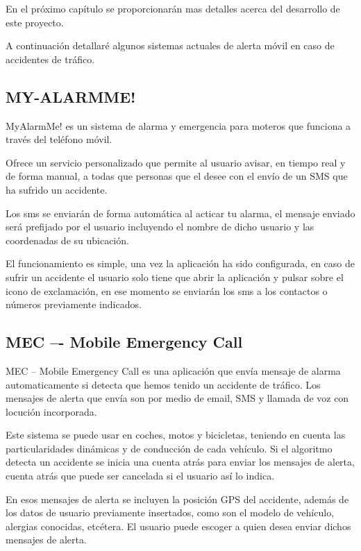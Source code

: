 		En el pr\'oximo cap\'itulo se proporcionar\'an mas detalles acerca del desarrollo de este proyecto.
		
		A continuaci\'on detallar\'e algunos sistemas actuales de alerta m\'ovil en caso de accidentes de tr\'afico.
		
		\subsection{MY-ALARMME!}
		
			MyAlarmMe! \cite{MyAlamMe} es un sistema de alarma y emergencia para moteros que funciona a trav\'es del tel\'efono m\'ovil.
			
			Ofrece un servicio personalizado que permite al usuario avisar, en tiempo real y de forma manual, a todas que personas que el desee con el env\'io de un SMS que ha sufrido un accidente.
			
			Los sms se enviar\'an de forma autom\'atica al acticar tu alarma, el mensaje enviado ser\'a prefijado por el usuario incluyendo el nombre de dicho usuario y las coordenadas de su ubicaci\'on.
			
			El funcionamiento es simple, una vez la aplicaci\'on ha sido configurada, en caso de sufrir un accidente el usuario solo tiene que abrir la aplicaci\'on y pulsar sobre el icono de exclamaci\'on, en ese momento se enviar\'an los sms a los contactos o n\'umeros previamente indicados.
		
		\subsection{MEC –- Mobile Emergency Call}
		
			MEC -- Mobile Emergency Call \cite{MEC} es una aplicaci\'on que env\'ia mensaje de alarma automaticamente si detecta que hemos tenido un accidente de tr\'afico. Los mensajes de alerta que env\'ia son por medio de email, SMS y llamada de voz con locuci\'on incorporada.
			
			Este sistema se puede usar en coches, motos y bicicletas, teniendo en cuenta las particularidades din\'amicas y de conducci\'on de cada veh\'iculo. Si el algoritmo detecta un accidente se inicia una cuenta atr\'as para enviar los mensajes de alerta, cuenta atr\'as que puede ser cancelada si el usuario as\'i lo indica.
			
			En esos mensajes de alerta se incluyen la posici\'on GPS del accidente, adem\'as de los datos de usuario previamente insertados, como son el modelo de veh\'iculo, alergias conocidas, etc\'etera. El usuario puede escoger a quien desea enviar dichos mensajes de alerta.
	
	

	\newpage
	$\ $